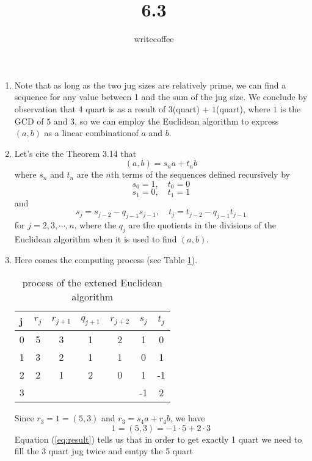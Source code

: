 \documentclass[11pt]{article}
\author{writecoffee} \title{6.3}
\begin{document}
\maketitle

{\setlength{\baselineskip}{1\baselineskip}
\setlength{\parindent}{0pt}
\setlength{\parskip}{2ex plus 0.5ex minus 0.2ex}
\begin{enumerate}[1.]
\item
	Note that as long as the two jug sizes are relatively prime, we can find a sequence for any value between 1 and the sum of the jug %
	size. We conclude by observation that 4 quart is as a result of $3$(quart) + $1$(quart), where $1$ is the GCD of $5$ and $3$, %
	so we can employ the Euclidean algorithm to express $(a, b)$ as a linear combinationof $a$ and $b$.
\item
	Let's cite the Theorem 3.14 \cite{ENT} that
	\begin{equation}
	(a, b) = s_na + t_nb
	\end{equation}
	where $s_n$ and $t_n$ are the $n$th terms of the sequences defined recursively by
	\[
	s_0 = 1, \quad t_0 = 0
	\]
	\[
	s_1 = 0, \quad t_1 = 1
	\]
	and
	\[
	s_j = s_{j-2} - q_{j-1}s_{j-1}, \quad t_j = t_{j-2} - q_{j-1}t_{j-1}
	\]
	for $j = 2,3,\cdots,n$, where the $q_j$ are the quotients in the divisions of the Euclidean algorithm when it is used to find %
	$(a,b)$.\\
\item
	Here comes the computing process (see Table \ref{tab:process}).
	\begin{table}
	\centering
	\begin{tabular}{l|cccccc}
	j & 	$r_j$ &	$r_{j+1}$ &	$q_{j+1}$ &	$r_{j+2}$ &	$s_j$ &	$t_j$	\\
	\midrule
	0 &	5 &	3 &		1 &		2 &		1 &	0	\\
	1 &	3 &	2 &		1 &		1 &		0 &	1	\\
	2 &	2 &	1 &		2 &		0 &		1 &	-1	\\
	3 &	&	& 		&		&		-1 &	2	\\
	\end{tabular}
	\caption{process of the extened Euclidean algorithm}
	\label{tab:process}
	\end{table}
	Since $r_3 = 1 = (5,3)$ and $r_3 = s_4a + r_4b$, we have
	\begin{equation}
	\label{eq:result}
	1 = (5, 3) = -1 \cdot 5 + 2 \cdot 3
	\end{equation}
	Equation (\ref{eq:result}) tells us that in order to get exactly 1 quart we need to fill the 3 quart jug twice and emtpy the 5 quart %

\end{enumerate}}
\end{document}
